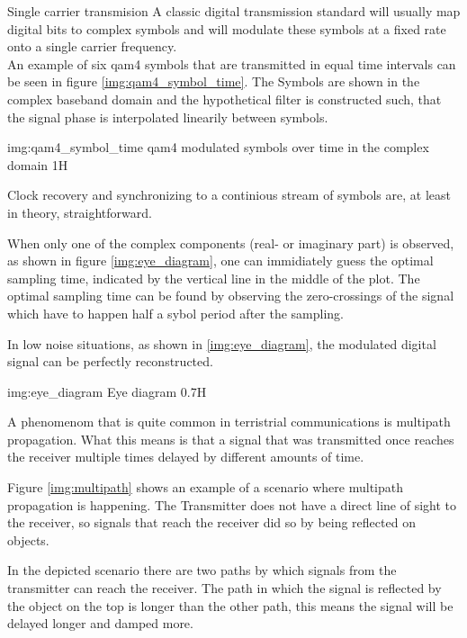 
\begin{subchapter}{Single carrier transmision}
  A classic digital transmission standard will usually map
  digital bits to complex symbols and will modulate these
  symbols at a fixed rate onto a single carrier frequency. \\

  An example of six \acrshort{qam4} symbols that are transmitted
  in equal time intervals can be seen in figure \ref{img:qam4_symbol_time}.
  The Symbols are shown in the complex baseband domain and the
  hypothetical filter is constructed such, that the signal
  phase is interpolated linearily between symbols.

               {img:qam4_symbol_time}
               {\acrshort{qam4} modulated symbols over time in the complex domain}
               {1}{H}

  Clock recovery and synchronizing to a continious stream of
  symbols are, at least in theory, straightforward.

  When only one of the complex components (real- or imaginary part)
  is observed, as shown in figure \ref{img:eye_diagram}, one can
  immidiately guess the optimal sampling time, indicated by the
  vertical line in the middle of the plot.
  The optimal sampling time can be found by observing the
  zero-crossings of the signal which have to happen half a
  sybol period after the sampling.

  In low noise situations, as shown in \ref{img:eye_diagram},
  the modulated digital signal can be perfectly reconstructed.

                  {img:eye_diagram}
                  {Eye diagram}
                  {0.7}{H}

  A phenomenom that is quite common in terristrial communications
  is multipath propagation.
  What this means is that a signal that was transmitted once reaches the
  receiver multiple times delayed by different amounts of time.

  Figure \ref{img:multipath} shows an example of a scenario where
  multipath propagation is happening.
  The Transmitter does not have a direct line of sight to the receiver,
  so signals that reach the receiver did so by being reflected
  on objects.

  In the depicted scenario there are two paths by which signals from
  the transmitter can reach the receiver.
  The path in which the signal is reflected by the object on
  the top is longer than the other path, this means the signal will
  be delayed longer and damped more.


\end{subchapter}
